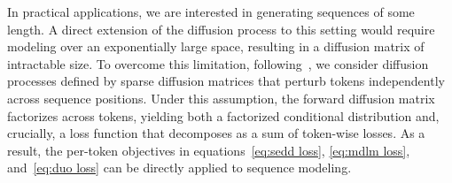   In practical applications, we are interested in generating sequences of some length. A direct extension of the diffusion process to this setting would require modeling over an exponentially large space, resulting in a diffusion matrix of intractable size. To overcome this limitation, following~\citep{lou2024discrete}, we consider diffusion processes defined by sparse diffusion matrices that perturb tokens independently across sequence positions. Under this assumption, the forward diffusion matrix factorizes across tokens, yielding both a factorized conditional distribution and, crucially, a loss function that decomposes as a sum of token-wise losses. As a result, the per-token objectives in equations~\eqref{eq:sedd loss}, \eqref{eq:mdlm loss}, and~\eqref{eq:duo loss} can be directly applied to sequence modeling.

